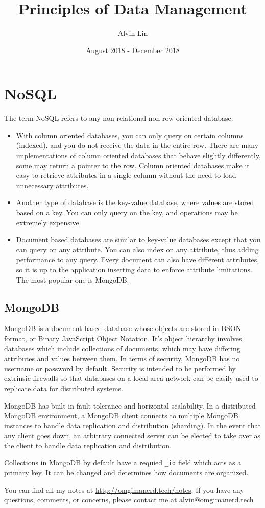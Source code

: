 \documentclass{math}
\title{Principles of Data Management}
\author{Alvin Lin}
\date{August 2018 - December 2018}
\begin{document}
\lstset{basicstyle=\ttfamily\footnotesize,breaklines=true}
\maketitle

\section*{NoSQL}
The term NoSQL refers to any non-relational non-row oriented database.
\begin{itemize}
  \item With column oriented databases, you can only query on certain columns
    (indexed), and you do not receive the data in the entire row. There are
    many implementations of column oriented databases that behave slightly
    differently, some may return a pointer to the row. Column oriented
    databases make it easy to retrieve attributes in a single column without
    the need to load unnecessary attributes.
  \item Another type of database is the key-value database, where values are
    stored based on a key. You can only query on the key, and operations may
    be extremely expensive.
  \item Document based databases are similar to key-value databases except
    that you can query on any attribute. You can also index on any attribute,
    thus adding performance to any query. Every document can also have different
    attributes, so it is up to the application inserting data to enforce
    attribute limitations. The most popular one is MongoDB.
\end{itemize}

\subsection*{MongoDB}
MongoDB is a document based database whose objects are stored in BSON format,
or Binary JavaScript Object Notation. It's object hierarchy involves databases
which include collections of documents, which may have differing attributes
and values between them. In terms of security, MongoDB has no username or
password by default. Security is intended to be performed by extrinsic firewalls
so that databases on a local area network can be easily used to replicate data
for distributed systems. \par
MongoDB has built in fault tolerance and horizontal scalability. In a
distributed MongoDB environment, a MongoDB client connects to multiple MongoDB
instances to handle data replication and distribution (sharding). In the event
that any client goes down, an arbitrary connected server can be elected to take
over as the client to handle data replication and distribution. \par
Collections in MongoDB by default have a requied \texttt{\_id} field which acts
as a primary key. It can be changed and determines how documents are organized.

\begin{center}
  You can find all my notes at \url{http://omgimanerd.tech/notes}. If you have
  any questions, comments, or concerns, please contact me at
  alvin@omgimanerd.tech
\end{center}
\end{document}
